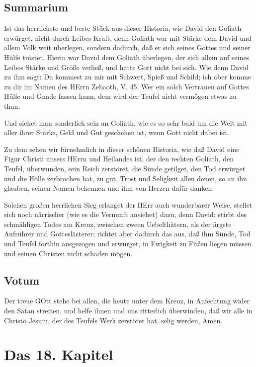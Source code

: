 \section{Summarium}

Ist das herrlichste und beste Stück aus dieser Historia, wie David den Goliath erwürget, nicht durch Leibes Kraft, denn Goliath war mit Stärke dem David und allem Volk weit überlegen, sondern dadurch, daß er sich seines Gottes und seiner Hülfe tröstet. Hierin war David dem Goliath überlegen, der sich allein auf seines Leibes Stärke und Größe verließ, und hatte Gott nicht bei sich. Wie denn David zu ihm sagt: Du kommest zu mir mit Schwert, Spieß und Schild; ich aber komme zu dir im Namen des HErrn Zebaoth, V. 45. Wer ein solch Vertrauen auf Gottes Hülfe und Gnade fassen kann, dem wird der Teufel nicht vermögen etwas zu thun.

Und siehet man sonderlich sein an Goliath, wie es so sehr bald um die Welt mit aller ihrer Stärke, Geld und Gut geschehen ist, wenn Gott nicht dabei ist.

Zu dem sehen wir fürnehmlich in dieser schönen Historia, wie daß David eine Figur Christi unsers HErrn und Heilandes ist, der den rechten Goliath, den Teufel, überwunden, sein Reich zerstöret, die Sünde getilget, den Tod erwürget und die Hölle zerbrochen hat, zu gut, Trost und Seligkeit allen denen, so an ihn glauben, seinen Namen bekennen und ihm von Herzen dafür danken.

Solchen großen herrlichen Sieg erlanget der HErr auch wunderbarer Weise, stellet sich noch närrischer (wie es die Vernunft ansiehet) dazu, denn David: stirbt des schmähligen Todes am Kreuz, zwischen zween Uebelthätern, als der ärgste Aufrührer und Gotteslästerer; richtet aber dadurch das aus, daß ihm Sünde, Tod und Teufel forthin ausgezogen und erwürget, in Ewigkeit zu Füßen liegen müssen und seinen Christen nicht schaden mögen.

\section{Votum}

Der treue GOtt stehe bei allen, die heute unter dem Kreuz, in Anfechtung wider den Satan streiten, und helfe ihnen und uns ritterlich überwinden, daß wir alle in Christo Jesum, der des Teufels Werk zerstöret hat, selig werden, Amen.

\chapter{Das 18. Kapitel}

